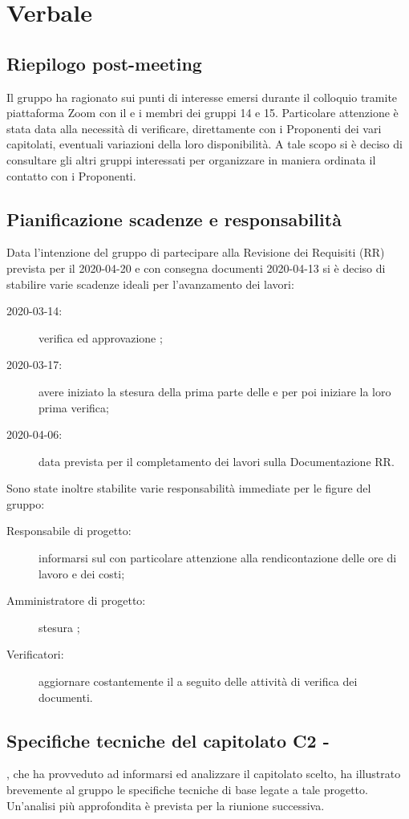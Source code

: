 \section{Verbale}
\subsection{Riepilogo post-meeting}
Il gruppo ha ragionato sui punti di interesse emersi durante il colloquio tramite piattaforma Zoom con il \TV{} e i membri dei gruppi 14 e 15. Particolare attenzione è stata data alla necessità di verificare, direttamente con i Proponenti dei vari capitolati, eventuali variazioni della loro disponibilità. A tale scopo si è deciso di consultare gli altri gruppi interessati per organizzare in maniera ordinata il contatto con i Proponenti.

\subsection{Pianificazione scadenze e responsabilità}
Data l'intenzione del gruppo di partecipare alla Revisione dei Requisiti (RR) prevista per il 2020-04-20 e con consegna documenti 2020-04-13 si è deciso di stabilire varie scadenze ideali per l'avanzamento dei lavori:
\begin{description}
	\item[2020-03-14:] verifica ed approvazione \SdF{};
	\item[2020-03-17:] avere iniziato la stesura della prima parte delle \NdP{} e per poi iniziare la loro prima verifica;
	\item[2020-04-06:] data prevista per il completamento dei lavori sulla Documentazione RR.
\end{description}
Sono state inoltre stabilite varie responsabilità immediate per le figure del gruppo:
\begin{description}
	\item[Responsabile di progetto:] informarsi sul \PdP{} con particolare attenzione alla rendicontazione delle ore di lavoro e dei costi;
	\item[Amministratore di progetto:] stesura \NdP{};
	\item[Verificatori:] aggiornare costantemente il \Glossario{} a seguito delle attività di verifica dei documenti.
\end{description}

\subsection{Specifiche tecniche del capitolato C2 - \NomeProgetto}
\EG{}, che ha provveduto ad informarsi ed analizzare il capitolato scelto, ha illustrato brevemente al gruppo le specifiche tecniche di base legate a tale progetto. Un'analisi più approfondita è prevista per la riunione successiva.

